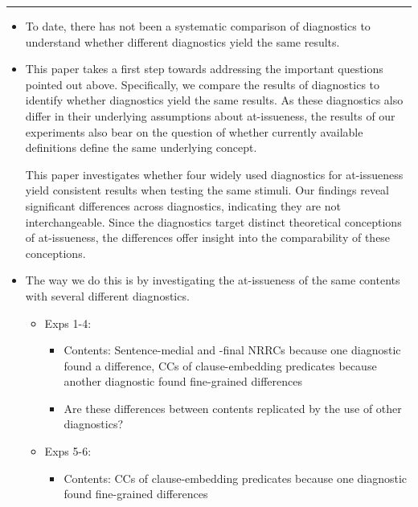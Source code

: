 \documentclass[times,linguex,xcolor]{glossa}
\begin{document}
  \hrule\smallskip
  \begin{itemize}

  \item To date, there has not been a systematic comparison of diagnostics to understand whether different diagnostics yield the same results.

    \item This paper takes a first step towards addressing the important questions pointed out above. Specifically, we compare the results of diagnostics to identify whether diagnostics yield the same results. As these diagnostics also differ in their underlying assumptions about at-issueness, the results of our experiments also bear on the question of whether currently available definitions define the same underlying concept.

    This paper investigates whether four widely used diagnostics for at-issueness yield consistent results when testing the same stimuli. Our findings reveal significant differences across diagnostics, indicating they are not interchangeable. Since the diagnostics target distinct theoretical conceptions of at-issueness, the differences offer insight into the comparability of these conceptions.

    \item The way we do this is by investigating the at-issueness of the same contents with several different diagnostics. 

    \begin{itemize}

    \item Exps 1-4:  

    \begin{itemize}

    \item Contents: Sentence-medial and -final NRRCs because one diagnostic found a difference, CCs of clause-embedding predicates because another diagnostic found fine-grained differences

    \item Are these differences between contents replicated by the use of other diagnostics?

    \end{itemize}

    \item Exps 5-6:

    \begin{itemize}

    \item Contents: CCs of clause-embedding predicates because one diagnostic found fine-grained differences


\end{itemize}
\end{itemize}
\end{itemize}
\end{document}
